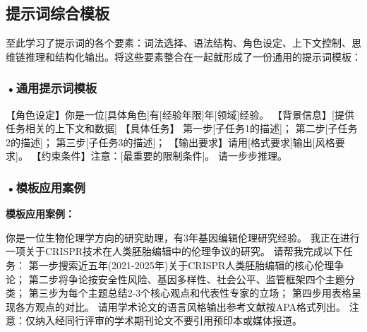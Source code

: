 
\subsection*{提示词综合模板}

至此学习了提示词的各个要素：词法选择、语法结构、角色设定、上下文控制、思维链推理和结构化输出。将这些要素整合在一起就形成了一份通用的提示词模板：

\subsubsection*{\textbf{•通用提示词模板}}


\begin{userbox}
【角色设定】你是一位[具体角色]有[经验年限]年[领域]经验。
【背景信息】[提供任务相关的上下文和数据]
【具体任务】
第一步[子任务1的描述]；
第二步[子任务2的描述]；
第三步[子任务3的描述]；
【输出要求】请用[格式要求]输出[风格要求]。
【约束条件】注意：[最重要的限制条件]。
请一步步推理。
\end{userbox}


\subsubsection*{\textbf{•模板应用案例}}
\textbf{模板应用案例：}


\begin{userbox}
你是一位生物伦理学方向的研究助理，有3年基因编辑伦理研究经验。
我正在进行一项关于CRISPR技术在人类胚胎编辑中的伦理争议的研究。
请帮我完成以下任务：
第一步搜索近五年(2021-2025年)关于CRISPR人类胚胎编辑的核心伦理争论；
第二步将争论按安全性风险、基因多样性、社会公平、监管框架四个主题分类；
第三步为每个主题总结2-3个核心观点和代表性专家的立场；
第四步用表格呈现各方观点的对比。
请用学术论文的语言风格输出参考文献按APA格式列出。
注意：仅纳入经同行评审的学术期刊论文不要引用预印本或媒体报道。
\end{userbox}

